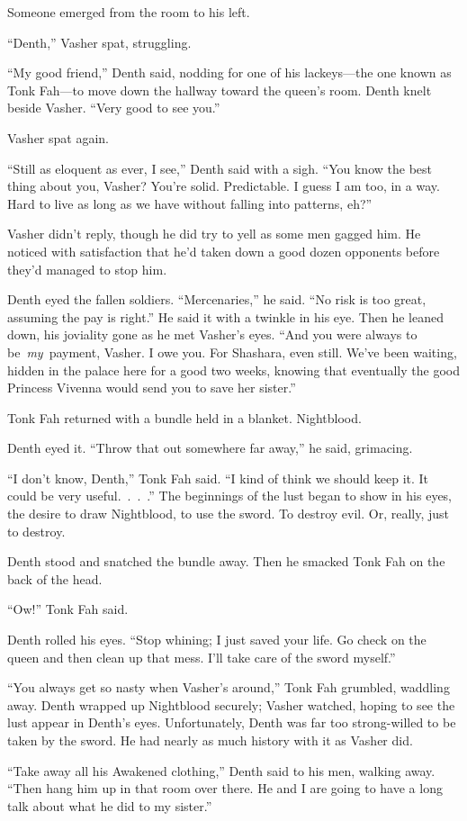 Someone emerged from the room to his left.

“Denth,” Vasher spat, struggling.

“My good friend,” Denth said, nodding for one of his lackeys—the one known as Tonk Fah—to move down the hallway toward the queen’s room. Denth knelt beside Vasher. “Very good to see you.”

Vasher spat again.

“Still as eloquent as ever, I see,” Denth said with a sigh. “You know the best thing about you, Vasher? You’re solid. Predictable. I guess I am too, in a way. Hard to live as long as we have without falling into patterns, eh?”

Vasher didn’t reply, though he did try to yell as some men gagged him. He noticed with satisfaction that he’d taken down a good dozen opponents before they’d managed to stop him.

Denth eyed the fallen soldiers. “Mercenaries,” he said. “No risk is too great, assuming the pay is right.” He said it with a twinkle in his eye. Then he leaned down, his joviality gone as he met Vasher’s eyes. “And you were always to be~\textit{my}~payment, Vasher. I owe you. For Shashara, even still. We’ve been waiting, hidden in the palace here for a good two weeks, knowing that eventually the good Princess Vivenna would send you to save her sister.”

Tonk Fah returned with a bundle held in a blanket. Nightblood.

Denth eyed it. “Throw that out somewhere far away,” he said, grimacing.

“I don’t know, Denth,” Tonk Fah said. “I kind of think we should keep it. It could be very useful.~.~.~.” The beginnings of the lust began to show in his eyes, the desire to draw Nightblood, to use the sword. To destroy evil. Or, really, just to destroy.

Denth stood and snatched the bundle away. Then he smacked Tonk Fah on the back of the head.

“Ow!” Tonk Fah said.

Denth rolled his eyes. “Stop whining; I just saved your life. Go check on the queen and then clean up that mess. I’ll take care of the sword myself.”

“You always get so nasty when Vasher’s around,” Tonk Fah grumbled, waddling away. Denth wrapped up Nightblood securely; Vasher watched, hoping to see the lust appear in Denth’s eyes. Unfortunately, Denth was far too strong-willed to be taken by the sword. He had nearly as much history with it as Vasher did.

“Take away all his Awakened clothing,” Denth said to his men, walking away. “Then hang him up in that room over there. He and I are going to have a long talk about what he did to my sister.”


